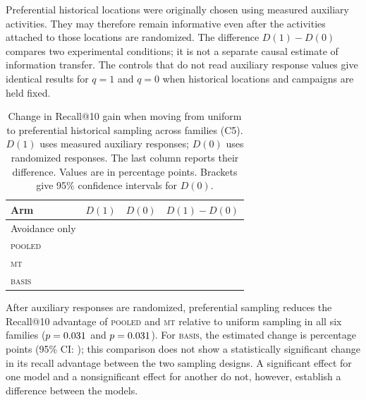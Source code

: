 \documentclass[10pt,letterpaper,runningheads]{llncs}
\renewcommand{\footnotesize}{\fontsize{10}{12}\selectfont}
\newcommand{\mt}{\textsc{mt}}
\newcommand{\pooled}{\textsc{pooled}}
\newcommand{\basis}{\textsc{basis}}
\begin{document}
Preferential historical locations were originally chosen using
measured auxiliary activities. They may therefore remain
informative even after the activities attached to those locations
are randomized. The difference $D(1)-D(0)$ compares two experimental
conditions; it is not a separate causal estimate of information
transfer. The \decompValidityArms{} controls that do not read
auxiliary response values give identical results for $q=1$ and
$q=0$ when historical locations and campaigns are held fixed.

\begin{table}[!htbp]
\centering
\caption{Change in Recall@10 gain when moving from uniform to
preferential historical sampling across \decompFamilies{} families (C5).
$D(1)$ uses measured auxiliary responses; $D(0)$ uses randomized
responses. The last column reports their difference. Values are in
percentage points. Brackets give 95\% confidence intervals for $D(0)$.}
\label{tab:decomp}
\setlength{\tabcolsep}{4pt}
\begin{tabular}{@{}lccc@{}}
\toprule
Arm & $D(1)$ & $D(0)$ & $D(1)-D(0)$ \\
\midrule
Avoidance only & \decompStlAvoidTotal{} & \decompStlAvoidArtefact{} \footnotesize\decompStlAvoidArtefactCi{} & \decompStlAvoidInformation{} \\
\pooled{} & \decompPooledTotal{} & \decompPooledArtefact{} \footnotesize\decompPooledArtefactCi{} & \decompPooledInformation{} \\
\mt{} & \decompMtTotal{} & \decompMtArtefact{} \footnotesize\decompMtArtefactCi{} & \decompMtInformation{} \\
\basis{} & \decompBasisTotal{} & \decompBasisArtefact{} \footnotesize\decompBasisArtefactCi{} & \decompBasisInformation{} \\
\bottomrule
\end{tabular}
\end{table}

After auxiliary responses are randomized, preferential sampling
reduces the Recall@10 advantage of \pooled{} and \mt{} relative
to uniform sampling in all six families
($p=0.031{}$ and $p=0.031{}$).
For \basis{}, the estimated change is \decompBasisArtefact{}
percentage points (95\% CI: \decompBasisArtefactCi{}); this
comparison does not show a statistically significant change in its
recall advantage between the two sampling designs. A significant effect
for one model and a nonsignificant effect for another do not, however,
establish a difference between the models.
\end{document}
